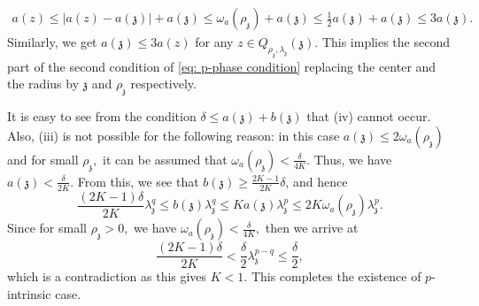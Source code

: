 \documentclass[11pt,oneside, english,reqno,twoside a4paper]{amsart}
\theoremstyle{definition}
\numberwithin{theorem}{section}
\numberwithin{equation}{section}
\begin{document}
\begin{align*}
    a(z)\leq |a(z)-a(\mathfrak{z})|+a(\mathfrak{z})\leq \omega_a(\rho_{\mathfrak{z}})+a(\mathfrak{z})\leq \frac{1}{2}a(\mathfrak{z})+a(\mathfrak{z})\leq 3 a(\mathfrak{z}).
\end{align*}
Similarly, we get $a(\mathfrak{z})\leq 3 a(z)$ for any $z \in  Q_{\rho_{\mathfrak{z}}, \lambda_{\mathfrak{z}}}(\mathfrak{z}).$ This implies the second part of the second condition of \eqref{eq: p-phase condition} replacing the center and the radius by $\mathfrak z$ and $\rho_{\mathfrak z}$ respectively. 

It is easy to see from the condition $\delta \leq a(\mathfrak{z})+b(\mathfrak{z})$ that (iv) cannot occur.  Also, (iii) is not possible for the following reason: in this case $a(\mathfrak{z})\leq 2\omega_a(\rho_{\mathfrak{z}})$ and for small $\rho_{\mathfrak{z}},$ it can be assumed that $\omega_a(\rho_{\mathfrak{z}})<\frac{\delta}{4K}$. Thus, we have $a(\mathfrak{z}) < \frac{\delta}{2K}$. From this, we see that $b(\mathfrak{z}) \geq \frac{2K-1}{2K}\delta$, and hence $$\frac{(2K-1)\delta}{2K}\lambda_{\mathfrak{z}}^q \leq b(\mathfrak{z})\lambda_{\mathfrak{z}}^q\leq Ka(\mathfrak{z})\lambda_{\mathfrak{z}}^p\leq 2K\omega_a(\rho_{\mathfrak{z}})\lambda_{\mathfrak{z}}^p.$$ 
Since for small $\rho_{\mathfrak{z}} >0,$ we have $\omega_a(\rho_{\mathfrak{z}})< \frac{\delta}{4K}, $ then we arrive at $$\frac{(2K-1)\delta}{2K}< \frac{\delta}{2}\lambda_{\mathfrak{z}}^{p-q}\leq \frac{\delta}{2},$$ which is a contradiction as this gives $K<1.$ This completes the existence of  $p$-intrinsic case.
\end{document}
